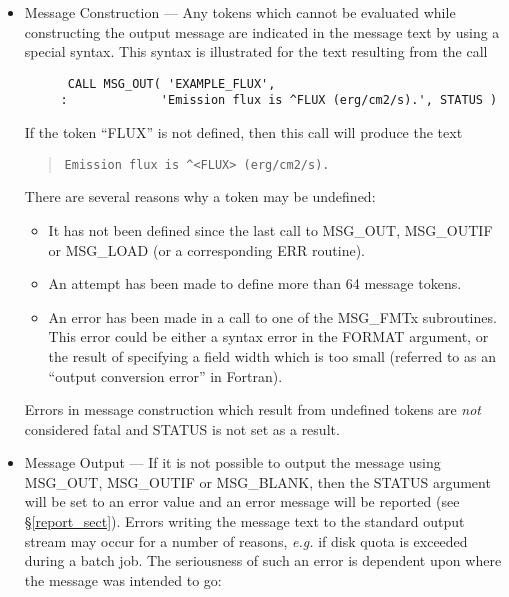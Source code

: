 \begin {itemize}
\item Message Construction --- Any tokens which cannot be evaluated while
constructing the output message are indicated in the message text by using a
special syntax. 
This syntax is illustrated for the text resulting from the call

\begin {small}
\begin{verbatim}
      CALL MSG_OUT( 'EXAMPLE_FLUX', 
     :             'Emission flux is ^FLUX (erg/cm2/s).', STATUS )
\end{verbatim}
\end {small}

If the token ``FLUX'' is not defined, then this call will produce the text 

\begin {quote}
\begin {small}
\begin{verbatim}
Emission flux is ^<FLUX> (erg/cm2/s).
\end{verbatim}
\end {small}
\end {quote}

There are several reasons why a token may be undefined:

\begin {itemize}
\item It has not been defined since the last call to MSG\_OUT, MSG\_OUTIF 
or MSG\_LOAD (or a corresponding ERR routine).

\item An attempt has been made to define more than 64 message tokens.

\item An error has been made in a call to one of the MSG\_FMTx subroutines. 
This error could be either a syntax error in the FORMAT argument, or the
result of specifying a field width which is too small (referred to 
as an ``output conversion error'' in Fortran). 
\end {itemize}

Errors in message construction which result from undefined tokens are {\em not}
considered fatal and STATUS is not set as a result.

\item Message Output --- If it is not possible to output the message using
MSG\_OUT, MSG\_OUTIF or MSG\_BLANK, then the STATUS argument will be set to an
error value and an  error message will be reported (see \S\ref{report_sect}).
Errors writing the message text to the standard output stream may occur for a
number of reasons, {\em e.g.} if disk quota is exceeded during a batch job.
The seriousness of such an error is dependent upon where the message was
intended to go:


\end{itemize}
